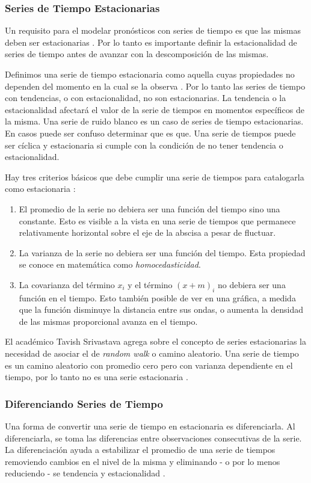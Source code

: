 \subsubsection{Series de Tiempo Estacionarias}
Un requisito para el modelar pronósticos con series de tiempo es que las mismas deben ser estacionarias \cite{srivastava}. Por lo tanto es importante definir la estacionalidad de series de tiempo antes de avanzar con la descomposición de las mismas.

Definimos una serie de tiempo estacionaria como aquella cuyas propiedades no dependen del momento en la cual se la observa \cite{hyndman}. Por lo tanto las series de tiempo con tendencias, o con estacionalidad, no son estacionarias. La tendencia o la estacionalidad afectará el valor de la serie de tiempos en momentos específicos de la misma. Una serie de ruido blanco es un caso de series de tiempo estacionarias. En casos puede ser confuso determinar que es que. Una serie de tiempos puede ser cíclica y estacionaria si cumple con la condición de no tener tendencia o estacionalidad.

Hay tres criterios básicos que debe cumplir una serie de tiempos para catalogarla como estacionaria \cite{srivastava}:

\begin{enumerate}
	\item El promedio de la serie no debiera ser una función del tiempo sino una constante. Esto es visible a la vista en una serie de tiempos que permanece relativamente horizontal sobre el eje de la abscisa a pesar de fluctuar.
	\item La varianza de la serie no debiera ser una función del tiempo. Esta propiedad se conoce en matemática como \emph{homocedasticidad}.
    \item La covarianza del término $x_i$ y el término $(x + m)_i$ no debiera ser una función en el tiempo. Esto también posible de ver en una gráfica, a medida que la función disminuye la distancia entre sus ondas, o aumenta la densidad de las mismas proporcional avanza en el tiempo.
\end{enumerate}

El académico Tavish Srivastava agrega sobre el concepto de series estacionarias la necesidad de asociar el de \emph{random walk} o camino aleatorio. Una serie de tiempo es un camino aleatorio con promedio cero pero con varianza dependiente en el tiempo, por lo tanto no es una serie estacionaria \cite{srivastava}.

\subsubsection{Diferenciando Series de Tiempo}
Una forma de convertir una serie de tiempo en estacionaria es diferenciarla. Al diferenciarla, se toma las diferencias entre observaciones consecutivas de la serie. La diferenciación ayuda a estabilizar el promedio de una serie de tiempos removiendo cambios en el nivel de la misma y eliminando - o por lo menos reduciendo - se tendencia y estacionalidad \cite{hyndman}.

